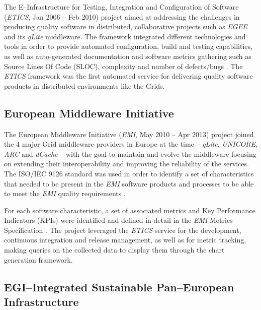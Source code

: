 \documentclass[journal]{IEEEtran}
\begin{document}
The E--Infrastructure for Testing, Integration and Configuration of Software
\cite{cordis:etics, cordis:etics2} ({\sl ETICS}, Jan 2006 -- Feb 2010) project aimed
at addressing the challenges in producing quality software in distributed,
collaborative projects such as {\sl EGEE} and its {\sl gLite} middleware. The framework
integrated different technologies and tools in order to provide automated configuration,
build and testing capabilities, as well as auto-generated documentation and
software metrics gathering such as Source Lines Of Code (SLOC), complexity and
number of defects/bugs \cite{etics}. The {\sl ETICS} framework was the first automated
service for delivering quality software products in distributed environments like
the Grids.



\subsection{European Middleware Initiative}

The European Middleware Initiative ({\sl EMI}, May 2010 -- Apr 2013)
\cite{cordis:emi} project joined the 4 major Grid middleware providers in
Europe at the time -- {\sl gLite}, {\sl UNICORE}, {\sl ARC} and {\sl dCache} --
with the goal to maintain and evolve the middleware focusing on extending their
interoperability and improving the reliability of the services. The
ISO/IEC 9126 \cite{iso-9126} standard was used in order to identify a set of
characteristics that needed to be present in the {\sl EMI} software products and
processes to be able to meet the {\sl EMI} quality requirements
\cite{emi-quality-model}.

For each software characteristic, a set of associated
metrics and Key Performance Indicators (KPIs) were identified and defined in
detail in the {\sl EMI} Metrics Specification \cite{emi-metrics}. The project
leveraged the {\sl ETICS} service for the development, continuous integration and release management,
as well as for metric tracking, making queries on the collected data to display
them through the chart generation framework.

\subsection{EGI--Integrated Sustainable Pan--European Infrastructure}
\end{document}
